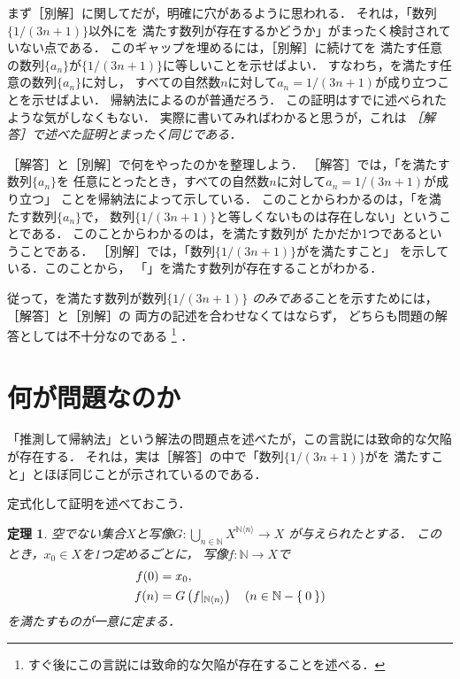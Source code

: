 \documentclass[11pt,a4paper]{ltjsarticle} %
\theoremstyle{mystyle} %
\newtheorem{thm}{定理} %
\begin{document}
 
まず［別解］に関してだが，明確に穴があるように思われる．
それは，「数列$\{ 1/(3n+1) \}$以外にを
満たす数列が存在するかどうか」がまったく検討されていない点である．
このギャップを埋めるには，［別解］に続けてを
満たす任意の数列$\{ a_n \}$が$\{ 1/(3n+1) \}$に等しいことを示せばよい．
すなわち，を満たす任意の数列$\{a_n \}$に対し，
すべての自然数$n$に対して$a_n = 1/(3n+1)$が成り立つことを示せばよい．
帰納法によるのが普通だろう．
この証明はすでに述べられたような気がしなくもない．
実際に書いてみればわかると思うが，これは
\emph{［解答］で述べた証明とまったく同じである．}

［解答］と［別解］で何をやったのかを整理しよう．
［解答］では，「を満たす数列$\{ a_n \}$を
任意にとったとき，すべての自然数$n$に対して$a_n = 1/(3n+1)$が成り立つ」
ことを帰納法によって示している．
このことからわかるのは，「を満たす数列$\{ a_n \}$で，
数列$\{ 1/(3n+1) \}$と等しくないものは存在しない」ということである．
このことからわかるのは，を満たす数列が
たかだか1つであるということである．
［別解］では，「数列$\{ 1/(3n+1) \}$がを満たすこと」
を示している．このことから，
「」を満たす数列が存在することがわかる．

従って，を満たす数列が数列$\{ 1/(3n+1) \}$
\emph{のみである}ことを示すためには，［解答］と［別解］の
両方の記述を合わせなくてはならず，
どちらも問題の解答としては不十分なのである
\footnote{
  すぐ後にこの言説には致命的な欠陥が存在することを述べる．
}
．


\section{何が問題なのか}
「推測して帰納法」という解法の問題点を述べたが，この言説には致命的な欠陥が存在する．
それは，実は［解答］の中で「数列$\{ 1/(3n+1) \}$がを
満たすこと」とほぼ同じことが示されているのである．
 

定式化して証明を述べておこう．
\begin{thm} \label{thm:inddef}
  空でない集合$X$と写像$G \colon \bigcup_{n \in \mathbb{N} } 
  X^{\mathbb{N} \langle n \rangle} \longrightarrow X$
  が与えられたとする．
  このとき，$x_0 \in X$を1つ定めるごとに，
  写像$f \colon \mathbb{N} \longrightarrow X$で
  \begin{align}
    \begin{aligned}
      f(0) & = x_0 , \\
      f(n) & = G \left( f|_{\mathbb{N} \langle n \rangle} \right)
      \quad ( n \in \mathbb{N} - \Set{0} )
    \end{aligned}
    \label{eq:inddef}
  \end{align}
  を満たすものが一意に定まる．
\end{thm}
\end{document}
